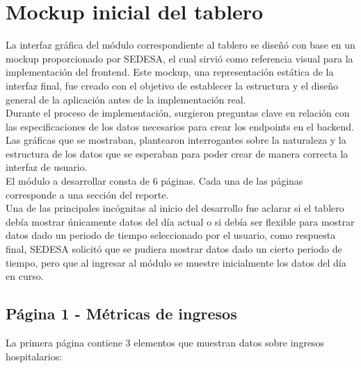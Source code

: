 \section{Mockup inicial del tablero}

La interfaz gráfica del módulo correspondiente al tablero se diseñó con base en un mockup proporcionado por SEDESA, el cual sirvió como referencia visual para la implementación del frontend. Este mockup, una representación estática de la interfaz final, fue creado con el objetivo de establecer la estructura y el diseño general de la aplicación antes de la implementación real.\\

Durante el proceso de implementación, surgieron preguntas clave en relación con las especificaciones de los datos necesarios para crear los endpoints en el backend. Las gráficas que se mostraban, plantearon interrogantes sobre la naturaleza y la estructura de los datos que se esperaban para poder crear de manera correcta la interfaz de usuario.\\

El módulo a desarrollar consta de 6 páginas.
Cada una de las páginas corresponde a una sección del reporte.\\

Una de las principales incógnitas al inicio del desarrollo fue aclarar si el tablero debía mostrar únicamente datos del día actual o si debía ser flexible para mostrar datos dado un periodo de tiempo seleccionado por el usuario, como respuesta final, SEDESA solicitó que se pudiera mostrar datos dado un cierto periodo de tiempo, pero que al ingresar al módulo se muestre inicialmente los datos del día en curso.

\subsection{Página 1 - Métricas de ingresos}
La primera página contiene 3 elementos que muestran datos sobre ingresos hospitalarios:

